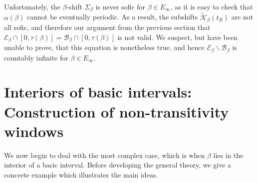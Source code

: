 \documentclass[11pt]{amsart}
\theoremstyle{definition}
\theoremstyle{remark}
\numberwithin{equation}{section}
\newcommand{\BB}{\mathscr{B}}
\newcommand{\EE}{\mathscr{E}}
\newcommand{\Kt}{\widetilde{\mathcal{K}}}
\newcommand{\f}{\infty}
\newcommand{\al}{\alpha}
\begin{document}
Unfortunately, the $\beta$-shift $\Sigma_\beta$ is never sofic for $\beta\in E_\f$, as it is easy to check that $\al(\beta)$ cannot be eventually periodic. As a result, the subshifts $\Kt_\beta(t_R)$ are not all sofic, and therefore our argument from the previous section that $\EE_\beta\cap[0,\tau(\beta)]=\BB_\beta\cap[0,\tau(\beta)]$ is not valid. We suspect, but have been unable to prove, that this equation is nonetheless true, and hence $\EE_\beta\backslash\BB_\beta$ is countably infinite for $\beta\in E_\f$.


\section{Interiors of basic intervals: Construction of non-transitivity windows} \label{sec:basic-interiors}

We now begin to deal with the most complex case, which is when $\beta$ lies in the interior of a basic interval. Before developing the general theory, we give a concrete example which illustrates the main ideas.
\end{document}
